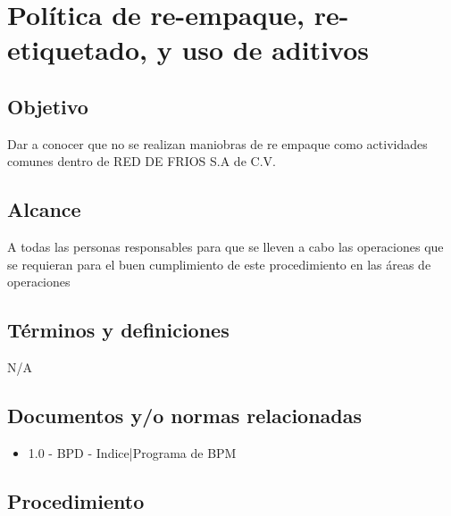 \renewcommand{\MayorVer}{2}
\renewcommand{\MenorVer}{1}
\renewcommand{\Codigo}{PSA-1-PROG} %
\renewcommand{\FechaPub}{2023--01}
\renewcommand{\Titulo}{Política de re-empaque, re-etiquetado, y uso de aditivos}

\section{\Titulo}


\subsection{Objetivo}

Dar a conocer que no se realizan maniobras de re empaque como actividades comunes dentro de RED DE FRIOS S.A de C.V.

\subsection{Alcance}

A todas las personas responsables para que se lleven a cabo las operaciones que se requieran para el buen cumplimiento de este procedimiento en las áreas de operaciones

\subsection{Términos y definiciones}

N/A

\subsection{Documentos y/o normas relacionadas}

\begin{itemize}
	\item 1.0 - BPD - Indice|Programa de BPM
\end{itemize}

\subsection{Procedimiento}

